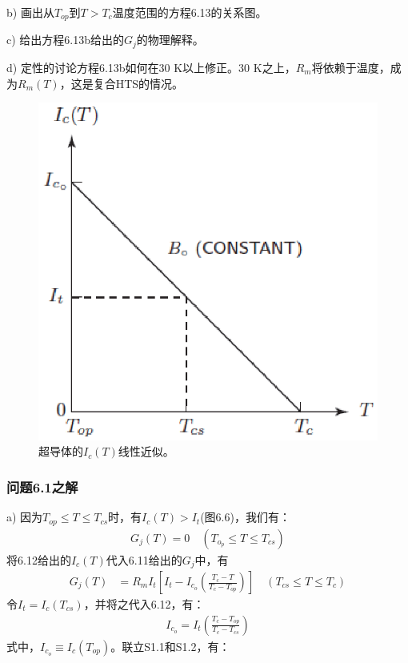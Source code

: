 b) 画出从$T_{op}$到$T>T_c$温度范围的方程6.13的关系图。

c) 给出方程6.13b给出的$G_j$的物理解释。

d) 定性的讨论方程6.13b如何在30 K以上修正。30 K之上，$R_m$将依赖于温度，成为$R_m(T)$，这是复合HTS的情况。

\begin{figure}[htbp]
	\centering
	\includegraphics[scale=0.7]{chpt6/figs/fig6.6.eps}
	\caption{超导体的$I_c(T)$线性近似。}
\end{figure}

\subsubsection{问题6.1之解}
a) 因为$T_{op}\le T\le T_{cs}$时，有$I_c(T)>I_t$(图6.6)，我们有：
\begin{align*}
G_j(T)=0 \quad (T_{o_p}\leq T \leq T_{cs}) \tag{6.13a}
\end{align*}
将6.12给出的$I_c(T)$代入6.11给出的$G_j$中，有
\begin{align*}
G_j(T)&=R_m I_t[I_t-I_{c_o} \left(\frac{T_c-T}{T_c-T_{op}}\right)]\quad (T_{cs}\leq T\leq T_c) \tag{S1.1}
\end{align*}
令$I_t=I_c(T_{cs})$，并将之代入6.12，有：
\begin{align*}%
I_{c_o}=I_t\left(\frac{T_c-T_{op} }{T_c-T_{cs}}\right) \tag{S1.2}
\end{align*}
式中，$I_{c_o}\equiv I_c(T_{op})$。联立S1.1和S1.2，有：

